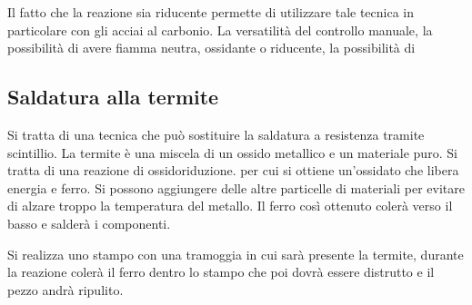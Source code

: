 Il fatto che la reazione sia riducente permette di utilizzare tale tecnica in particolare con gli acciai al carbonio.
La versatilità del controllo manuale, la possibilità di avere fiamma neutra, ossidante o riducente, la possibilità di \moretodo{\\aggiungi}



\subsection{Saldatura alla termite}
Si tratta di una tecnica che può sostituire la saldatura a resistenza tramite scintillio.
La termite è una miscela di un ossido metallico e un materiale puro.
Si tratta di una reazione di ossidoriduzione. per cui si ottiene un'ossidato che libera energia e ferro. Si possono aggiungere delle altre particelle di materiali per evitare di alzare troppo la temperatura del metallo.
Il ferro così ottenuto colerà verso il basso e salderà i componenti.

Si realizza uno stampo con una tramoggia in cui sarà presente la termite, durante la reazione colerà il ferro dentro lo stampo che poi dovrà essere distrutto e il pezzo andrà ripulito.

